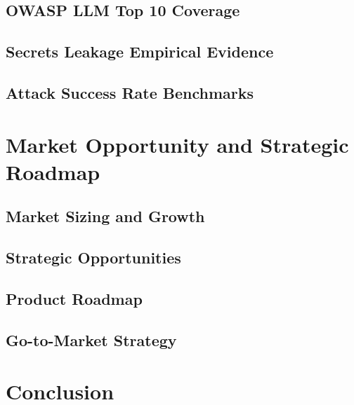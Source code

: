 \documentclass[11pt,letterpaper]{article}
\begin{document}
\subsection{OWASP LLM Top 10 Coverage}

\subsection{Secrets Leakage Empirical Evidence}

\subsection{Attack Success Rate Benchmarks}

\section{Market Opportunity and Strategic Roadmap}

\subsection{Market Sizing and Growth}

\subsection{Strategic Opportunities}

\subsection{Product Roadmap}

\subsection{Go-to-Market Strategy}

\section{Conclusion}



\end{document}
